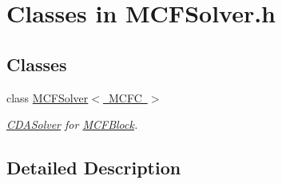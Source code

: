 \hypertarget{group___m_c_f_solver___c_l_a_s_s_e_s}{}\section{Classes in M\+C\+F\+Solver.\+h}
\label{group___m_c_f_solver___c_l_a_s_s_e_s}
\subsection*{Classes}
\begin{DoxyCompactItemize}
\item 
class \mbox{\hyperlink{class_s_m_spp__di__unipi__it_1_1_m_c_f_solver}{M\+C\+F\+Solver$<$ M\+C\+F\+C $>$}}
\begin{DoxyCompactList}\small\item\em \mbox{\hyperlink{class_s_m_spp__di__unipi__it_1_1_c_d_a_solver}{C\+D\+A\+Solver}} for \mbox{\hyperlink{class_s_m_spp__di__unipi__it_1_1_m_c_f_block}{M\+C\+F\+Block}}. \end{DoxyCompactList}\end{DoxyCompactItemize}


\subsection{Detailed Description}

